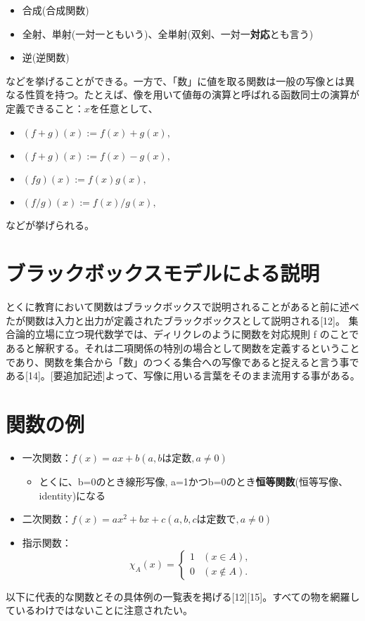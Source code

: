 \documentclass[a4j,12pt]{jreport}
\begin{document}
\begin{itemize}
\item 合成(合成関数)
\item 全射、単射(一対一ともいう)、全単射(双剣、一対一{\bf 対応}とも言う)
\item 逆(逆関数)
\end{itemize}
などを挙げることができる。一方で、「数」に値を取る関数は一般の写像とは異なる性質を持つ。たとえば、像を用いて値毎の演算と呼ばれる函数同士の演算が定義できること：$x$を任意として、

\begin{itemize}
\item $(f + g)(x) := f(x) + g(x),$
\item $(f + g)(x) := f(x) - g(x),$
\item $(fg)(x) := f(x)g(x),$
\item $(f/g)(x) := f(x)/g(x),$
\end{itemize}

などが挙げられる。
\section{ブラックボックスモデルによる説明}
とくに教育において関数はブラックボックスで説明されることがあると前に述べたが関数は入力と出力が定義されたブラックボックスとして説明される[12]。
集合論的立場に立つ現代数学では、ディリクレのように関数を対応規則 f のことであると解釈する。それは二項関係の特別の場合として関数を定義するということであり、関数を集合から「数」のつくる集合への写像であると捉えると言う事である[14]。[要追加記述]よって、写像に用いる言葉をそのまま流用する事がある。


\section{関数の例}
\begin{itemize}
 \item 一次関数：$f(x) = ax + b( a,bは定数, a ≠ 0 )$
 \begin{itemize}
  \item とくに、b=0のとき線形写像, a=1かつb=0のとき{\bf 恒等関数}(恒等写像、identity)になる
 \end{itemize}
 \item 二次関数：$f(x) = ax^2 + bx+c( a,b,cは定数で, a ≠ 0 )$
 \item 指示関数：
\begin{equation}
\chi_A (x) = \begin{cases}
  1 & (x \in A), \\
  0 & (x \notin A).
  \end{cases}
\end{equation}
\end{itemize}
以下に代表的な関数とその具体例の一覧表を掲げる[12][15]。すべての物を網羅しているわけではないことに注意されたい。
\end{document}
